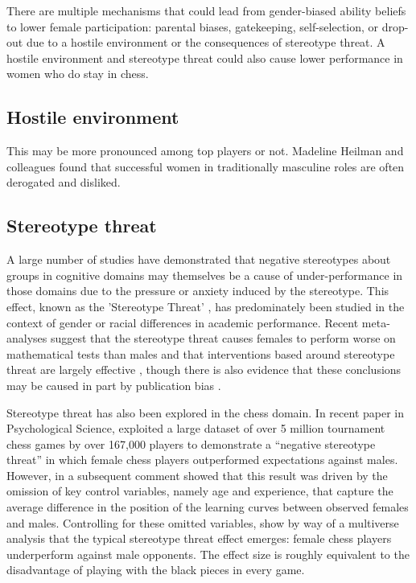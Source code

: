  There are multiple mechanisms that could lead from gender-biased ability beliefs to lower female participation: parental biases, gatekeeping, self-selection, or drop-out due to a hostile environment or the consequences of stereotype threat. A hostile environment and stereotype threat could also cause lower performance in women who do stay in chess.

\subsection*{Hostile environment} 
This may be more pronounced among top players or not. Madeline Heilman and colleagues found that successful women in traditionally masculine roles are often derogated and disliked.


\subsection*{Stereotype threat}
A large number of studies have demonstrated that negative stereotypes about groups in cognitive domains may themselves be a cause of under-performance in those domains due to the pressure or anxiety induced by the stereotype. This effect, known as the 'Stereotype Threat' \cite{steelearonson1995ST}, has predominately been studied in the context of gender or racial differences in academic performance. Recent meta-analyses suggest that the stereotype threat causes females to perform worse on mathematical tests than males \cite{PichoRodriguezFinnie2013JSocPsych} and that interventions based around stereotype threat are largely effective \cite{LiuLiuWangZhang2020J.App.Psych}, though there is also evidence that these conclusions may be caused in part by publication bias \cite{DoyleVoyer2016;JelteWicherts2015JSchoolPsych}.

Stereotype threat has also been explored in the chess domain. In recent paper in Psychological Science, \cite{Stafford2018PsySci} exploited a large dataset of over 5 million tournament chess games by over 167,000 players to demonstrate a ``negative stereotype threat'' in which female chess players outperformed expectations against males. However, in a subsequent comment \cite{smerdon2020female} showed that this result was driven by the omission of key control variables, namely age and experience, that capture the average difference in the position of the learning curves between observed females and males. Controlling for these omitted variables, \cite{smerdon2020female} show by way of a multiverse analysis that the typical stereotype threat effect emerges: female chess players underperform against male opponents. The effect size is roughly equivalent to the disadvantage of playing with the black pieces in every game.

